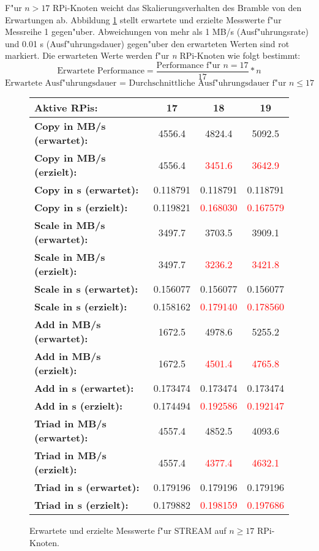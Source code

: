 F"ur $n > 17$ RPi-Knoten weicht das Skalierungsverhalten des Bramble von den Erwartungen ab. Abbildung \ref{fig:stream-abweichung} stellt erwartete und erzielte Messwerte f"ur Messreihe 1 gegen"uber. Abweichungen von mehr als 1 MB/s (Ausf"uhrungsrate) und 0.01 s (Ausf"uhrungsdauer) gegen"uber den erwarteten Werten sind rot markiert. Die erwarteten Werte werden f"ur \textit{n} RPi-Knoten wie folgt bestimmt: 
\[\text{Erwartete Performance} = \frac{\text{Performance f"ur }n=17}{17}\ast n\] 
\[\text{Erwartete Ausf"uhrungsdauer = Durchschnittliche Ausf"uhrungsdauer f"ur }n\leq 17\]
\begin{figure}[htb]
  \centering
  \begin{tabular}{|l|c|c|c|}
    \hline 
    \textbf{Aktive RPis:} & \textbf{17} & \textbf{18} & \textbf{19}\\ 
    \hline 
    \textbf{Copy in MB/s (erwartet):} & 4556.4 & 4824.4 & 5092.5\\
    \hline 
    \textbf{Copy in MB/s (erzielt):} & 4556.4 & \textcolor{red}{3451.6} & \textcolor{red}{3642.9}\\
    \hline 
    \textbf{Copy in s (erwartet):} & 0.118791 & 0.118791 & 0.118791\\
    \hline 
    \textbf{Copy in s (erzielt):} & 0.119821 & \textcolor{red}{0.168030} & \textcolor{red}{0.167579}\\
    \hline 
    \textbf{Scale in MB/s (erwartet):} & 3497.7 & 3703.5 & 3909.1\\
    \hline 
    \textbf{Scale in MB/s (erzielt):} & 3497.7 & \textcolor{red}{3236.2} & \textcolor{red}{3421.8}\\
    \hline 
	\textbf{Scale in s (erwartet):} & 0.156077 & 0.156077 & 0.156077\\
    \hline 
    \textbf{Scale in s (erzielt):} & 0.158162 & \textcolor{red}{0.179140} & \textcolor{red}{0.178560}\\
    \hline 
    \textbf{Add in MB/s (erwartet):} & 1672.5 & 4978.6 & 5255.2\\
    \hline 
    \textbf{Add in MB/s (erzielt):} & 1672.5 & \textcolor{red}{4501.4} & \textcolor{red}{4765.8}\\
    \hline 
    \textbf{Add in s (erwartet):} & 0.173474 & 0.173474 & 0.173474\\
    \hline 
    \textbf{Add in s (erzielt):} & 0.174494 & \textcolor{red}{0.192586} & \textcolor{red}{0.192147}\\
    \hline 
    \textbf{Triad in MB/s (erwartet):} & 4557.4 & 4852.5 & 4093.6\\
    \hline 
    \textbf{Triad in MB/s (erzielt):} & 4557.4 & \textcolor{red}{4377.4} & \textcolor{red}{4632.1}\\
    \hline 
    \textbf{Triad in s (erwartet):} & 0.179196 & 0.179196 & 0.179196\\
    \hline 
    \textbf{Triad in s (erzielt):} & 0.179882 & \textcolor{red}{0.198159} & \textcolor{red}{0.197686}\\
    \hline 
  \end{tabular}
  \caption{Erwartete und erzielte Messwerte f"ur STREAM auf $n\geq 17$ RPi-Knoten.}\label{fig:stream-abweichung}
\end{figure}
